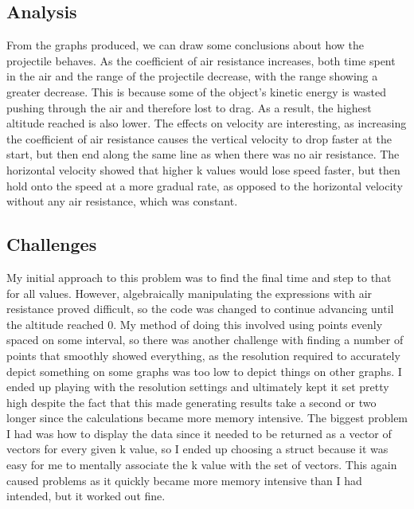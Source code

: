 \documentclass[oneside]{article}
\begin{document}
\subsection{Analysis}
From the graphs produced, we can draw some conclusions about how the projectile behaves. As the coefficient of air resistance increases, both time spent in the air and the range of the projectile decrease, with the range showing a greater decrease. This is because some of the object's kinetic energy is wasted pushing through the air and therefore lost to drag. As a result, the highest altitude reached is also lower. The effects on velocity are interesting, as increasing the coefficient of air resistance causes the vertical velocity to drop faster at the start, but then end along the same line as when there was no air resistance. The horizontal velocity showed that higher k values would lose speed faster, but then hold onto the speed at a more gradual rate, as opposed to the horizontal velocity without any air resistance, which was constant. 
\subsection{Challenges}
My initial approach to this problem was to find the final time and step to that for all values. However, algebraically manipulating the expressions with air resistance proved difficult, so the code was changed to continue advancing until the altitude reached 0. My method of doing this involved using points evenly spaced on some interval, so there was another challenge with finding a number of points that smoothly showed everything, as the resolution required to accurately depict something on some graphs was too low to depict things on other graphs. I ended up playing with the resolution settings and ultimately kept it set pretty high despite the fact that this made generating results take a second or two longer since the calculations became more memory intensive. The biggest problem I had was how to display the data since it needed to be returned as a vector of vectors for every given k value, so I ended up choosing a struct because it was easy for me to mentally associate the k value with the set of vectors. This again caused problems as it quickly became more memory intensive than I had intended, but it worked out fine.
\end{document}
